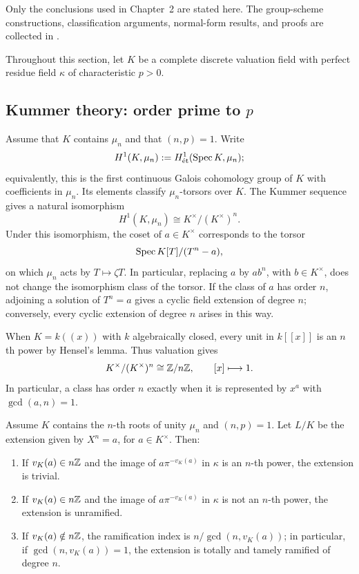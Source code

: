 Only the conclusions used in Chapter~2 are stated here. The group-scheme
constructions, classification arguments, normal-form results, and proofs are
collected in .

Throughout this section, let $K$ be a complete discrete valuation field with
perfect residue field $\kappa$ of characteristic $p>0$.

\subsection{Kummer theory: order prime to \texorpdfstring{$p$}{p}}

Assume that $K$ contains $\mu_n$ and that $(n,p)=1$. Write
\[
H^1(K,\mu_n):=H^1_{\mathrm{\acute et}}(\operatorname{Spec} K,\mu_n);
\]
equivalently, this is the first continuous Galois cohomology group of $K$
with coefficients in $\mu_n$. Its elements classify $\mu_n$-torsors over
$K$. The Kummer sequence gives a natural isomorphism
\[
H^1(K,\mu_n)\cong K^\times/(K^\times)^n.
\]
Under this isomorphism, the coset of $a\in K^\times$ corresponds to the
torsor
\[
\operatorname{Spec} K[T]/(T^n-a),
\]
on which $\mu_n$ acts by $T\mapsto\zeta T$. In particular, replacing $a$
by $ab^n$, with $b\in K^\times$, does not change the isomorphism class of
the torsor. If the class of $a$ has order $n$, adjoining a solution of
$T^n=a$ gives a cyclic field extension of degree $n$; conversely, every
cyclic extension of degree $n$ arises in this way.

When $K=k((x))$ with $k$ algebraically closed, every unit in $k[[x]]$ is an
$n$th power by Hensel's lemma. Thus valuation gives
\begin{equation}\label{eq:kummer_local_normal_form}
K^\times/(K^\times)^n\cong\mathbb{Z}/n\mathbb{Z},\qquad [x]\longmapsto 1.
\end{equation}
In particular, a class has order $n$ exactly when it is represented by
$x^a$ with $\gcd(a,n)=1$.

\begin{theorem}
\label{theorem:kummer_ramification}
Assume $K$ contains the $n$-th roots of unity $\mu_n$ and $(n,p)=1$.
Let $L/K$ be the extension given by $X^n=a$, for $a\in K^\times$.
Then:
\begin{enumerate}
    \item If $v_K(a)\in n\mathbb{Z}$ and the image of
    $a\pi^{-v_K(a)}$ in $\kappa$ is an $n$-th power, the extension is
    trivial.
    \item If $v_K(a)\in n\mathbb{Z}$ and the image of
    $a\pi^{-v_K(a)}$ in $\kappa$ is not an $n$-th power, the extension is
    unramified.
    \item If $v_K(a)\notin n\mathbb{Z}$, the ramification index is
    $n/\gcd(n,v_K(a))$; in particular, if $\gcd(n,v_K(a))=1$, the extension
    is totally and tamely ramified of degree $n$.
\end{enumerate}
\end{theorem}

